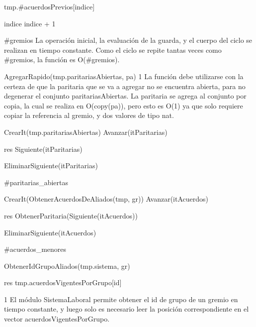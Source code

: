 {
	\state {} 					
			
		\state

		\state tmp.\#acuerdosPrevios[indice] 			

		\state
		\state indice \asig indice + 1					
	\endwhile
}
{\#gremios}
{ La operación inicial, la evaluación de la guarda, y el cuerpo del ciclo se realizan en tiempo constante. Como el ciclo se repite tantas veces como \#gremios, la función es O(\#gremios). }

{
	\state AgregarRapido(tmp.paritariasAbiertas, pa)		
}
{1}
{ La función debe utilizarse con la certeza de que la paritaria que se va a agregar no se encuentra abierta, para no degenerar el conjunto paritariasAbiertas. La paritaria se agrega al conjunto por copia, la cual se realiza en O(copy(pa)), pero esto es O(1) ya que solo requiere copiar la referencia al gremio, y dos valores de tipo nat. }

{
	\state {} \asig CrearIt(tmp.paritariasAbiertas)		
			
		\state
		\state Avanzar(itParitarias)								
	\endwhile
	\state

	\state res \asig Siguiente(itParitarias)						

	\state EliminarSiguiente(itParitarias)							
}
{\#paritarias\_abiertas}
{\addtocounter{lipsumcounter}{1}}

{
	\state {} \asig CrearIt(ObtenerAcuerdosDeAliados(tmp, gr))		
			
		\state
		\state Avanzar(itAcuerdos)  								
	\endwhile
	\state

	\state res \asig ObtenerParitaria(Siguiente(itAcuerdos))		

	\state EliminarSiguiente(itAcuerdos)							
}
{\#acuerdos\_menores}
{\addtocounter{lipsumcounter}{1}}

{
	\state {} \asig ObtenerIdGrupoAliados(tmp.sistema, gr)		

	\state res \asig tmp.acuerdosVigentesPorGrupo[id]							
}
{1}
{ El módulo SistemaLaboral permite obtener el id de grupo de un gremio en tiempo constante, y luego solo es necesario leer la posición correspondiente en el vector acuerdosVigentesPorGrupo. }

